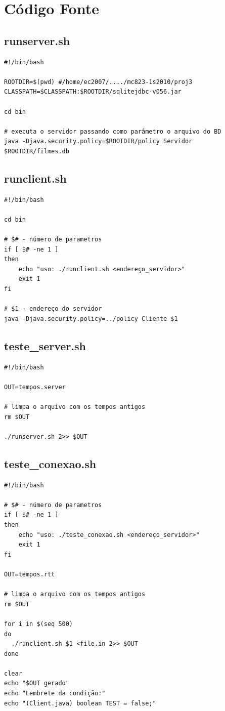 \documentclass[11pt,twoside]{article}
\begin{document}
\section{Código Fonte}

\subsection{runserver.sh}  %
\begin{verbatim}
#!/bin/bash

ROOTDIR=$(pwd) #/home/ec2007/..../mc823-1s2010/proj3
CLASSPATH=$CLASSPATH:$ROOTDIR/sqlitejdbc-v056.jar

cd bin

# executa o servidor passando como parâmetro o arquivo do BD
java -Djava.security.policy=$ROOTDIR/policy Servidor $ROOTDIR/filmes.db
\end{verbatim}


\subsection{runclient.sh} %
\begin{verbatim}
#!/bin/bash

cd bin

# $# - número de parametros 
if [ $# -ne 1 ]
then
    echo "uso: ./runclient.sh <endereço_servidor>"
    exit 1
fi

# $1 - endereço do servidor
java -Djava.security.policy=../policy Cliente $1
\end{verbatim}


\subsection{teste\_server.sh} %
\begin{verbatim}
#!/bin/bash

OUT=tempos.server

# limpa o arquivo com os tempos antigos
rm $OUT

./runserver.sh 2>> $OUT
\end{verbatim}


\subsection{teste\_conexao.sh}     %
\begin{verbatim}
#!/bin/bash

# $# - número de parametros 
if [ $# -ne 1 ]
then
    echo "uso: ./teste_conexao.sh <endereço_servidor>"
    exit 1
fi

OUT=tempos.rtt

# limpa o arquivo com os tempos antigos
rm $OUT

for i in $(seq 500)
do
  ./runclient.sh $1 <file.in 2>> $OUT
done

clear
echo "$OUT gerado"
echo "Lembrete da condição:"
echo "(Client.java) boolean TEST = false;"
\end{verbatim}
\end{document}
